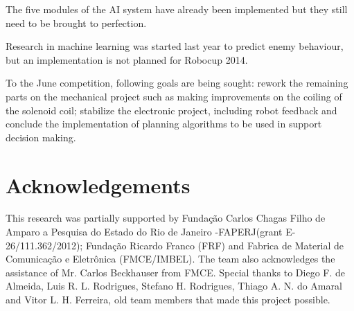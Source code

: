 \documentclass{llncs}
\begin{document}
The five modules of the AI system have already been implemented but they still
need to be brought to perfection.

Research in machine learning was started last year to predict enemy behaviour,
but an implementation is not planned for Robocup 2014.

To the June competition, following goals are being sought:
rework the remaining parts on the mechanical project such as making improvements on the coiling of the solenoid coil;
stabilize the electronic project, including robot feedback and
conclude the implementation of planning algorithms to be used in support decision making.

\section*{Acknowledgements}
This research was partially supported by Fundação Carlos Chagas Filho de Amparo a Pesquisa do Estado do Rio de Janeiro -FAPERJ(grant E-26/111.362/2012);
Fundação Ricardo Franco (FRF) and Fabrica de Material de Comunicação e Eletrônica (FMCE/IMBEL). The team also acknowledges the assistance of Mr. Carlos
Beckhauser from FMCE. Special thanks to Diego F. de Almeida, Luis R. L. Rodrigues, Stefano H. Rodrigues, Thiago A. N. do Amaral and Vitor L. H. Ferreira,
old team members that made this project possible.
\end{document}
